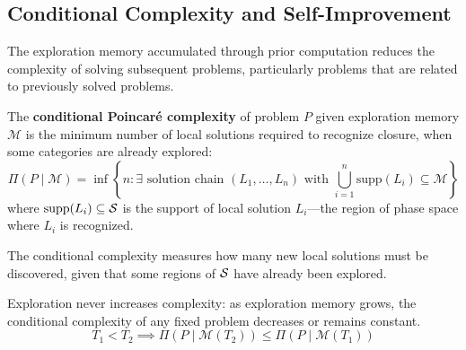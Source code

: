 \subsection{Conditional Complexity and Self-Improvement}

The exploration memory accumulated through prior computation reduces the complexity of solving subsequent problems, particularly problems that are related to previously solved problems.

\begin{definition}
\label{def:conditional_complexity}
The \textbf{conditional Poincaré complexity} of problem $P$ given exploration memory $\mathcal{M}$ is the minimum number of local solutions required to recognize closure, when some categories are already explored:
\begin{equation}
\Pi(P \mid \mathcal{M}) = \inf \left\{ n : \exists \text{ solution chain } (L_1, \ldots, L_n) \text{ with } \bigcup_{i=1}^n \text{supp}(L_i) \subseteq \mathcal{M} \right\}
\label{eq:conditional_complexity}
\end{equation}
where $\text{supp}(L_i) \subseteq \mathcal{S}$ is the support of local solution $L_i$—the region of phase space where $L_i$ is recognized.

The conditional complexity measures how many new local solutions must be discovered, given that some regions of $\mathcal{S}$ have already been explored.
\end{definition}

\begin{theorem}
\label{thm:complexity_reduction}
Exploration never increases complexity: as exploration memory grows, the conditional complexity of any fixed problem decreases or remains constant.
\begin{equation}
T_1 < T_2 \implies \Pi(P \mid \mathcal{M}(T_2)) \leq \Pi(P \mid \mathcal{M}(T_1))
\label{eq:complexity_reduction}
\end{equation}
\end{theorem}

